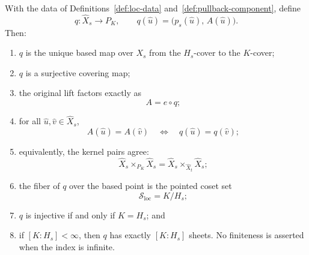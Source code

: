 \begin{theorem}\label{thm:sheet-resolution}
With the data of Definitions~\ref{def:loc-data} and~\ref{def:pullback-component}, define
\begin{equation}\label{eq:q-def}
  q\colon\widehat X_s\longrightarrow P_K,
  \qquad
  q(\widehat u)=\bigl(p_s(\widehat u),\,A(\widehat u)\bigr).
\end{equation}
Then:
\begin{enumerate}
\item \( q \) is the unique based map over \( X_s \) from the \( H_s \)-cover to the \( K \)-cover;
\item \( q \) is a surjective covering map;
\item the original lift factors exactly as
\begin{equation}\label{eq:factorization}
  A=e\circ q;
\end{equation}
\item for all \( \widehat u,\widehat v\in\widehat X_s \),
\begin{equation}\label{eq:kernel-equiv}
  A(\widehat u)=A(\widehat v)
  \quad\Longleftrightarrow\quad
  q(\widehat u)=q(\widehat v);
\end{equation}
\item equivalently, the kernel pairs agree:
\begin{equation}\label{eq:kernel-pair}
  \widehat X_s\times_{P_K}\widehat X_s
  =
  \widehat X_s\times_{\widehat X_t}\widehat X_s;
\end{equation}
\item the fiber of \( q \) over the based point is the pointed coset set
\begin{equation}\label{eq:sheet-fiber}
  \mathcal S_{\mathrm{loc}}=K/H_s;
\end{equation}
\item \( q \) is injective if and only if \( K=H_s \); and
\item if \( [K:H_s]<\infty \), then \( q \) has exactly \( [K:H_s] \) sheets.  No finiteness is asserted when the index is infinite.
\end{enumerate}
\end{theorem}

